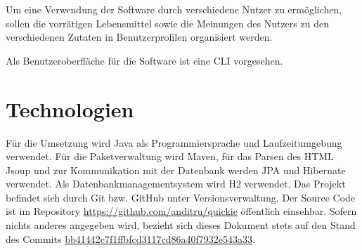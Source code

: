 Um eine Verwendung der Software durch verschiedene Nutzer zu ermöglichen, sollen die vorrätigen Lebensmittel sowie die Meinungen des Nutzers zu den verschiedenen Zutaten in Benutzerprofilen organisiert werden.

Als Benutzeroberfläche für die Software ist eine \ac{CLI} vorgesehen.

\section{Technologien}
Für die Umsetzung wird Java als Programmiersprache und Laufzeitumgebung verwendet. Für die Paketverwaltung wird Maven, für das Parsen des HTML Jsoup und zur Kommunikation mit der Datenbank werden JPA und Hibernate verwendet. Als Datenbankmanagementsystem wird H2 verwendet. Das Projekt befindet sich durch Git bzw. GitHub unter Versionsverwaltung. Der Source Code ist im Repository \href{https://youtu.be/dQw4w9WgXcQ}{https://github.com/anditru/quickie} öffentlich einsehbar. Sofern nichts anderes angegeben wird, bezieht sich dieses Dokument stets auf den Stand des Commits \href{https://github.com/anditru/quickie/tree/bb41442c7f1ffbfcd3117cd86a40f7932e543a33}{bb41442c7f1ffbfcd3117cd86a40f7932e543a33}.
